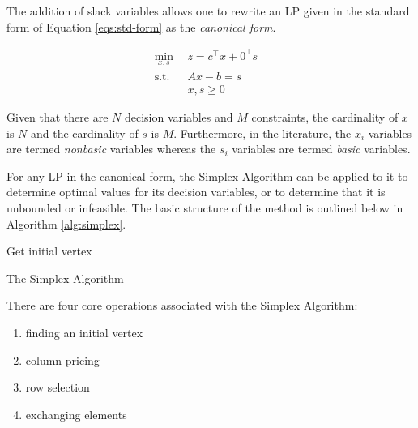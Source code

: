 The addition of slack variables allows one to rewrite an LP given in the
standard form of Equation \ref{eqs:std-form} as the \textit{canonical form}.

\begin{subequations}\label{eqs:can-form}
  \begin{align}
    \min_{x, s} \:\: & 
    z =  c^{\top} x + 0^{\top} s
    & \label{eqs:can-form_obj} \\
    \text{s.t.} \:\: &
    A x - b = s
    & \label{eqs:can-form_sup} \\
    &
    x, s \geq 0
    &\label{eqs:can-form_x}
  \end{align}
\end{subequations}

Given that there are $N$ decision variables and $M$ constraints, the cardinality
of $x$ is $N$ and the cardinality of $s$ is $M$. Furthermore, in the literature,
the $x_i$ variables are termed \textit{nonbasic} variables whereas the $s_i$
variables are termed \textit{basic} variables.

For any LP in the canonical form, the Simplex Algorithm can be applied to it to
determine optimal values for its decision variables, or to determine that it is
unbounded or infeasible. The basic structure of the method is outlined below in
Algorithm \ref{alg:simplex}.

\begin{algorithm}[h!]
 \SetAlgoLined
 Get initial vertex\;
  \caption{The Simplex Algorithm}\label{alg:simplex}
\end{algorithm}

There are four core operations associated with the Simplex Algorithm:
\begin{enumerate}
  \item finding an initial vertex
  \item column pricing
  \item row selection
  \item exchanging elements
\end{enumerate}

